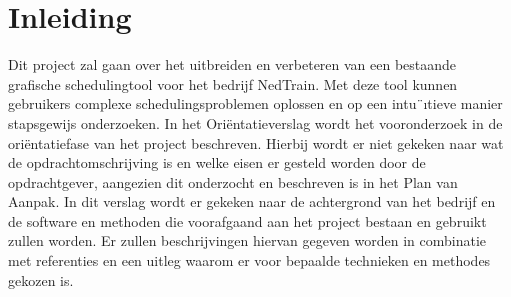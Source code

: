 \section{Inleiding}
Dit project zal gaan over het uitbreiden en verbeteren van een bestaande grafische schedulingtool
voor het bedrijf NedTrain. Met deze tool kunnen gebruikers complexe schedulingsproblemen
oplossen en op een intu¨ıtieve manier stapsgewijs onderzoeken. In het Ori\"entatieverslag wordt het vooronderzoek in de ori\"entatiefase van het project beschreven. Hierbij wordt er niet gekeken naar wat de opdrachtomschrijving is en welke eisen er gesteld worden door de opdrachtgever, aangezien dit onderzocht en beschreven is in het Plan van Aanpak. In dit verslag wordt er gekeken naar de achtergrond van het bedrijf en de software en methoden die voorafgaand aan het project bestaan en gebruikt zullen worden. Er zullen beschrijvingen hiervan gegeven worden in combinatie met referenties en een uitleg waarom er voor bepaalde technieken en methodes gekozen is.
